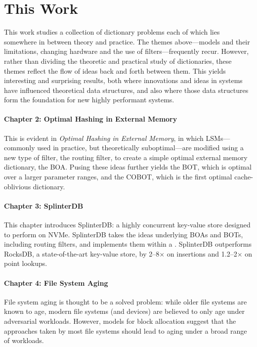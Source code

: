 \section{This Work}

This work studies a collection of dictionary problems each of which lies
somewhere in between theory and practice. The themes above---models and their
limitations, changing hardware and the use of filters---frequently recur.
However, rather than dividing the theoretic and practical study of
dictionaries, these themes reflect the flow of ideas back and forth between
them. This yields interesting and surprising results, both where innovations
and ideas in systems have influenced theoretical data structures, and also
where those data structures form the foundation for new highly performant
systems.

\paragraph{Chapter 2: Optimal Hashing in External Memory}

This is evident in \textit{Optimal Hashing in External Memory}, in which
LSMs---commonly used in practice, but theoretically suboptimal---are modified
using a new type of filter, the routing filter, to create a simple optimal
external memory dictionary, the BOA. Pusing these ideas further yields the BOT,
which is optimal over a larger parameter ranges, and the COBOT, which is the
first optimal cache-oblivious dictionary.

\paragraph{Chapter 3: SplinterDB}

This chapter introduces SplinterDB: a highly concurrent key-value store
designed to perform on NVMe. SplinterDB takes the ideas underlying BOAs and
BOTs, including routing filters, and implements them within a \bet. SplinterDB
outperforms RocksDB, a state-of-the-art key-value store, by 2--8$\times$ on
insertions and 1.2--2$\times$ on point lookups.

\paragraph{Chapter 4: File System Aging}

File system aging is thought to be a solved problem: while older file systems
are known to age, modern file systems (and devices) are believed to only age
under adversarial workloads. However, models for block allocation suggest that
the approaches taken by most file systems should lead to aging under a broad
range of workloads.

